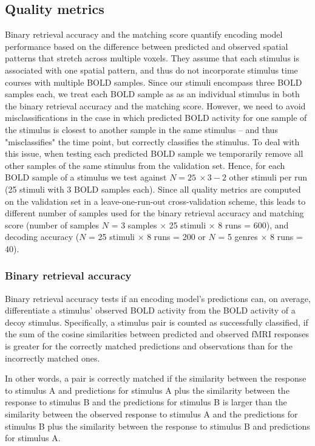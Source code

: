 \subsection*{Quality metrics} 

Binary retrieval accuracy and the matching score quantify encoding model performance based on the difference between predicted and observed spatial patterns that stretch across multiple voxels. They assume that each stimulus is associated with one spatial pattern, and thus do not incorporate stimulus time courses with multiple BOLD samples. Since our stimuli encompass three BOLD samples each, we treat each BOLD sample as as an individual stimulus in both the binary retrieval accuracy and the matching score. However, we need to avoid misclassifications in the case in which predicted BOLD activity for one sample of the stimulus is closest to another sample in the same stimulus -- and thus "misclassifies" the time point, but correctly classifies the stimulus. To deal with this issue, when testing each predicted BOLD sample we temporarily remove all other samples of the same stimulus from the validation set.
Hence, for each BOLD sample of a stimulus we test against $N = 25\:\times 3 - 2$ other stimuli per run (25 stimuli with 3 BOLD samples each).
Since all quality metrics are computed on the validation set in a leave-one-run-out cross-validation scheme, this leads to different number of samples used for the binary retrieval accuracy and matching score (number of samples $N$ = 3 samples $\times$ 25 stimuli $\times$ 8 runs = 600), and decoding accuracy ($N$ = 25 stimuli $\times$ 8 runs = 200 or $N$ = 5 genres $\times$ 8 runs = 40).

\subsubsection*{Binary retrieval accuracy}

Binary retrieval accuracy \citep{ML08} tests if an encoding model's predictions can, on average, differentiate a stimulus' observed BOLD activity from the BOLD activity of a decoy stimulus. Specifically, a stimulus pair is counted as successfully classified, if the sum of the cosine similarities between predicted and observed f{MRI} responses is greater for the correctly matched predictions and observations than for the incorrectly matched ones.

In other words, a pair is correctly matched if the similarity between the response to stimulus A and predictions for stimulus A plus the similarity between the response to stimulus B and the predictions for stimulus B is larger than the similarity between the observed response to stimulus A and the predictions for stimulus B plus the similarity between the response to stimulus B and predictions for stimulus A.

